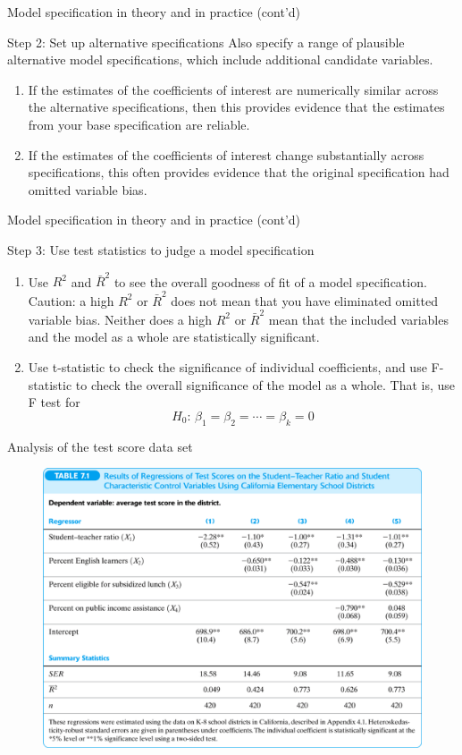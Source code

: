 \documentclass[presentation,10pt]{beamer}
\begin{document}
\begin{frame}[label={sec:orgde3a9b7}]{Model specification in theory and in practice (cont'd)}
\begin{block}{Step 2: Set up alternative specifications}
Also specify a range of plausible \alert{alternative model
specifications}, which include additional candidate variables.
\begin{enumerate}
\item If the estimates of the coefficients of interest are numerically
similar across the alternative specifications, then this
provides evidence that the estimates from your base
specification are reliable.
\item If the estimates of the coefficients of interest change
substantially across specifications, this often provides
evidence that the original specification had omitted variable
bias.
\end{enumerate}
\end{block}
\end{frame}

\begin{frame}[label={sec:orgca3fdec}]{Model specification in theory and in practice (cont'd)}
\begin{block}{Step 3: Use test statistics to judge a model specification}
\begin{enumerate}
\item Use \(R^2\) and \(\bar{R}^2\) to see the overall goodness of fit of
a model specification. Caution: a high \(R^2\) or \(\bar{R}^2\) does
not mean that you have eliminated omitted variable bias. Neither
does a high \(R^2\) or \(\bar{R}^2\) mean that the included
variables and the model as a whole are statistically
significant.
\item Use t-statistic to check the significance of individual
coefficients, and use F-statistic to check the overall
significance of the model as a whole. That is, use F test for
\[H_0:\, \beta_1 = \beta_2 = \cdots = \beta_k = 0 \]
\end{enumerate}
\end{block}
\end{frame}

\begin{frame}[shrink,label={sec:org58bce13}]{Analysis of the test score data set}
\begin{figure}[htbp]
\centering
\includegraphics[width=.9\linewidth]{img/tab-7-1.png}
\end{figure}
\end{frame}
\end{document}

